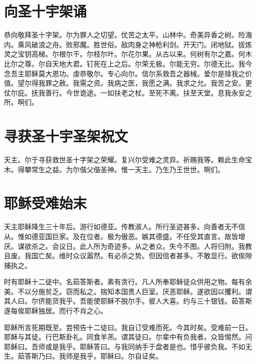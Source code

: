 \documentclass[UTF8,17pt]{ctexart}
\begin{document}
\section{向圣⼗宇架诵}

恭向敬拜圣⼗字架。尔为罪⼈之切望。忧苦之太平。⼭林中。奇美异⾹之树。险海内。乘风破浪之⾈。败邪魔。胜世俗。敌⾁⾝之神枪利剑。开天门。闭地狱。拔炼灵之宝钥⾼梯。尔根尔⼲。尔枝尔叶。尔花尔果。从古以来。何树有尔之嘉。何⽊⽐尔之尊。尔⾃天地⼤君。钉死在上之后。尔荣⽆极。尔能⽆穷。尔德⽆⽐。我今念吾主耶稣莫⼤恩功。虔恭敬尔。专⼼向尔。信尔系救吾之器械。爱尔是赎我之价值。望尔得我罪之赦。我需之资。我病之医，我愿之满。我求之允。我苦之安。更仗尔庇。抚我善⾏。今世诡途。⼀如扶⽼之杖。⾄死不离。扶⾄天堂。息我永安之所。啊们。

\section{寻获圣⼗宇圣架祝⽂}

天主。尔于寻获救世圣⼗字架之荣耀。复兴尔受难之灵异。祈赐我等。赖此⽣命宝⽊。得攀常⽣之益。为尔偕⽗偕圣神。惟⼀天主。乃⽣乃王世世。啊们。

\section{耶稣受难始末}

天主耶稣降⽣三⼗年后。游⾏如德亚。传教淑⼈。所⾏圣迹甚多。向善者⽆不信从。惟如德亚国巨家。及在位者。极为傲恶。嫉其德盛。不任受其直⾔。故皆增厌。谋欲杀之。会议⽇。此⼈所为奇迹多。从之者众。失今不图。⼈将归附。我教且废。我国亡矣。维时众议嚣然。有必杀之势。但因信者甚多。不敢显⾏。欲俟隙捕执之。

时有耶稣⼗⼆徒中。名茹答斯者。素有贪⾏。凡⼈所奉耶稣徒众供⽤之物。每有余美。不以分施贫乏。窃⽽私之。揣知本国贵⼈巨室。厌恶耶稣。遂欲因以攫利。谓其⼈曰。尔侪能货我乎。吾能使耶稣不脱尔⼿。彼⼈⼤喜。约与三⼗银钱。茹答斯遂每俟耶稣独居。⽽⾏不肖之⼼。

耶稣所⾔死期既⾄。尝预告⼗⼆徒曰。我⾃订受难⽽死。今其时矣。受难前⼀⽇。耶稣与其徒。⾏巴斯卦礼。同⾷⽺羔。谓其徒曰。尔辈中有负我者。众皆惕然。问耶稣曰。吾师或是我乎。耶稣答曰。与我同纳⼿于盘者是也。惜乎彼负我。不如⽆⽣。茹答斯乃曰。我师是我乎。耶稣曰。尔⾃证矣。
\end{document}
